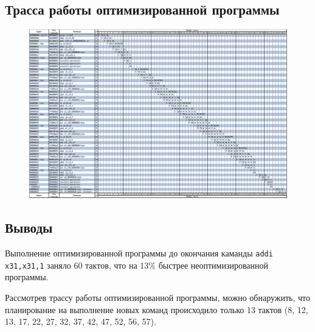 \pagebreak

\subsection{Трасса работы оптимизированной программы}

\begin{figure}
	\includegraphics[width=\linewidth]{img/opt.png}
\end{figure}

\subsection{Выводы}

Выполнение оптимизированной программы до окончания каманды \verb|addi x31,x31,1| заняло 60 тактов, что на 13\% быстрее неоптимизированной программы.

Рассмотрев трассу работы оптимизированной программы, можно обнаружить, что планирование на выполнение новых команд происходило только 13 тактов (8, 12, 13, 17, 22, 27, 32, 37, 42, 47, 52, 56, 57).



